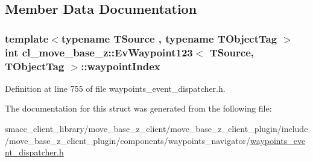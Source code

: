 \subsection{Member Data Documentation}
\subsubsection[{\texorpdfstring{waypoint\+Index}{waypointIndex}}]{\setlength{\rightskip}{0pt plus 5cm}template$<$typename T\+Source , typename T\+Object\+Tag $>$ int {\bf cl\+\_\+move\+\_\+base\+\_\+z\+::\+Ev\+Waypoint123}$<$ T\+Source, T\+Object\+Tag $>$\+::waypoint\+Index}\hypertarget{structcl__move__base__z_1_1EvWaypoint123_ad3275c3ba72c3012449e9f35f867be49}{}\label{structcl__move__base__z_1_1EvWaypoint123_ad3275c3ba72c3012449e9f35f867be49}


Definition at line 755 of file waypoints\+\_\+event\+\_\+dispatcher.\+h.



The documentation for this struct was generated from the following file\+:\begin{DoxyCompactItemize}
\item 
smacc\+\_\+client\+\_\+library/move\+\_\+base\+\_\+z\+\_\+client/move\+\_\+base\+\_\+z\+\_\+client\+\_\+plugin/include/move\+\_\+base\+\_\+z\+\_\+client\+\_\+plugin/components/waypoints\+\_\+navigator/\hyperlink{waypoints__event__dispatcher_8h}{waypoints\+\_\+event\+\_\+dispatcher.\+h}\end{DoxyCompactItemize}
